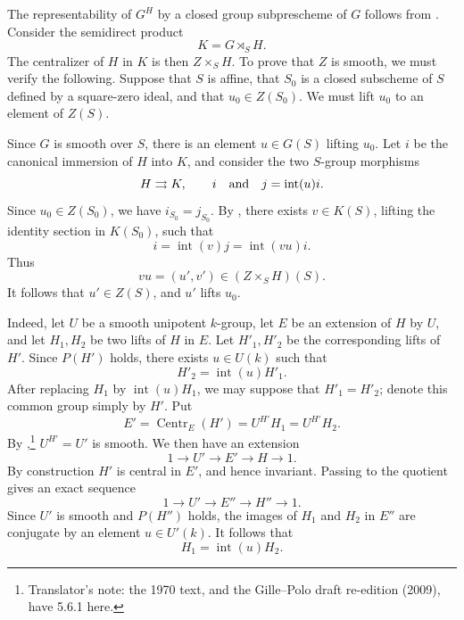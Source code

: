 The representability of \(G^H\) by a closed group subprescheme of
\(G\) follows from .  Consider the semidirect
product
\[
  K=G\rtimes_S H.
\]
The centralizer of \(H\) in \(K\) is then \(Z\times_S H\).  To prove
that \(Z\) is smooth, we must verify the following.  Suppose that
\(S\) is affine, that \(S_0\) is a closed subscheme of \(S\) defined
by a square-zero ideal, and that \(u_0\in Z(S_0)\).  We must lift
\(u_0\) to an element of \(Z(S)\).

Since \(G\) is smooth over \(S\), there is an element \(u\in G(S)\)
lifting \(u_0\).  Let \(i\) be the canonical immersion of \(H\) into
\(K\), and consider the two \(S\)-group morphisms
\[
  H\rightrightarrows K,\qquad i
  \quad\hbox{and}\quad
  j=\operatorname{int}(u)i.
\]
Since \(u_0\in Z(S_0)\), we have \(i_{S_0}=j_{S_0}\).  By
, there exists \(v\in K(S)\), lifting the identity
section in \(K(S_0)\), such that
\[
  i=\operatorname{int}(v)j
   =\operatorname{int}(vu)i.
\]
Thus
\[
  vu=(u',v')\in (Z\times_S H)(S).
\]
It follows that \(u'\in Z(S)\), and \(u'\) lifts \(u_0\).


Indeed, let \(U\) be a smooth unipotent \(k\)-group, let \(E\) be an
extension of \(H\) by \(U\), and let \(H_1,H_2\) be two lifts of
\(H\) in \(E\).  Let \(H'_1,H'_2\) be the corresponding lifts of
\(H'\).  Since \(P(H')\) holds, there exists \(u\in U(k)\) such that
\[
  H'_2=\operatorname{int}(u)H'_1.
\]
After replacing \(H_1\) by \(\operatorname{int}(u)H_1\), we may
suppose that \(H'_1=H'_2\); denote this common group simply by
\(H'\).  Put
\[
  E'=\operatorname{Centr}_E(H')
     =U^{H'}H_1
     =U^{H'}H_2.
\]
By ,\footnote{Translator's note: the 1970 text, and the Gille--Polo draft re-edition (2009), have
5.6.1 here.} \(U^{H'}=U'\) is smooth.  We then have an extension
\[
  1\longrightarrow U'\longrightarrow E'
    \longrightarrow H\longrightarrow1.
\]
By construction \(H'\) is central in \(E'\), and hence invariant.
Passing to the quotient gives an exact sequence
\[
  1\longrightarrow U'\longrightarrow E''
    \longrightarrow H''\longrightarrow1.
\]
Since \(U'\) is smooth and \(P(H'')\) holds, the images of \(H_1\)
and \(H_2\) in \(E''\) are conjugate by an element
\(u\in U'(k)\).  It follows that
\[
  H_1=\operatorname{int}(u)H_2.
\]

